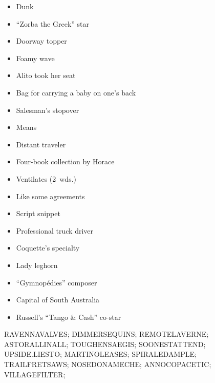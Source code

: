 {  \item
    \begin{itemize}
      \item
        Dunk
      \item
        ``Zorba the Greek'' star
      \item
        Doorway topper
      \item
        Foamy wave
      \item
        Alito took her seat
      \item
        Bag for carrying a baby on one's back
    \end{itemize}
  \item
    \begin{itemize}
      \item
        Salesman's stopover
      \item
        Means
      \item
        Distant traveler
      \item
        Four-book collection by Horace
      \item
        Ventilates (2~wds.)
    \end{itemize}
  \item
    \begin{itemize}
      \item
        Like some agreements
      \item
        Script snippet
      \item
        Professional truck driver
      \item
        Coquette's specialty
    \end{itemize}
  \item
    \begin{itemize}
      \item
        Lady leghorn
      \item
        ``Gymnop\'{e}dies'' composer
      \item
        Capital of South Australia
    \end{itemize}
  \item
    \begin{itemize}
      \item
        Russell's ``Tango \& Cash'' co-star
    \end{itemize}
}{%
  \puzzlerow RAVENNAVALVES;
  \puzzlerow DIMMERSEQUINS;
  \puzzlerow REMOTELAVERNE;
  \puzzlerow ASTORALLINALL;
  \puzzlerow TOUGHENSAEGIS;
  \puzzlerow SOONESTATTEND;
  \puzzlerow UPSIDE.LIESTO;
  \puzzlerow MARTINOLEASES;
  \puzzlerow SPIRALEDAMPLE;
  \puzzlerow TRAILFRETSAWS;
  \puzzlerow NOSEDONAMECHE;
  \puzzlerow ANNOCOPACETIC;
  \puzzlerow VILLAGEFILTER;
}
